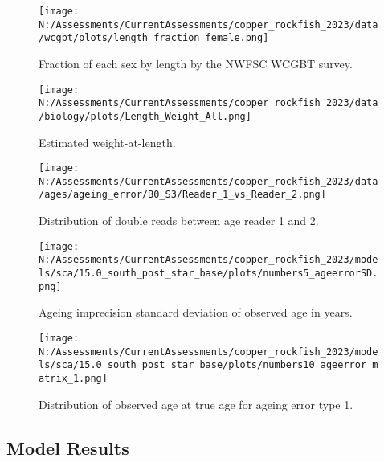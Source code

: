 \documentclass[11pt,
  english,
  letterpaper,
]{article}
\begin{document}
\pagebreak

\begin{figure}
\centering
\texttt{[image: N:/Assessments/CurrentAssessments/copper\_rockfish\_2023/data/wcgbt/plots/length\_fraction\_female.png]}
\caption{Fraction of each sex by length by the NWFSC WCGBT survey.\label{fig:frac-sex-len}}
\end{figure}

\pagebreak

\begin{figure}
\centering
\texttt{[image: N:/Assessments/CurrentAssessments/copper\_rockfish\_2023/data/biology/plots/Length\_Weight\_All.png]}
\caption{Estimated weight-at-length.\label{fig:weight-length}}
\end{figure}

\pagebreak

\begin{figure}
\centering
\texttt{[image: N:/Assessments/CurrentAssessments/copper\_rockfish\_2023/data/ages/ageing\_error/B0\_S3/Reader\_1\_vs\_Reader\_2.png]}
\caption{Distribution of double reads between age reader 1 and 2.\label{fig:age-error-dist}}
\end{figure}

\pagebreak

\begin{figure}
\centering
\texttt{[image: N:/Assessments/CurrentAssessments/copper\_rockfish\_2023/models/sca/15.0\_south\_post\_star\_base/plots/numbers5\_ageerrorSD.png]}
\caption{Ageing imprecision standard deviation of observed age in years.\label{fig:age-error}}
\end{figure}

\pagebreak

\begin{figure}
\centering
\texttt{[image: N:/Assessments/CurrentAssessments/copper\_rockfish\_2023/models/sca/15.0\_south\_post\_star\_base/plots/numbers10\_ageerror\_matrix\_1.png]}
\caption{Distribution of observed age at true age for ageing error type 1.\label{fig:age-error-matrix}}
\end{figure}

\pagebreak

\hypertarget{model-results}{%
\subsection{Model Results}\label{model-results}}
\end{document}
